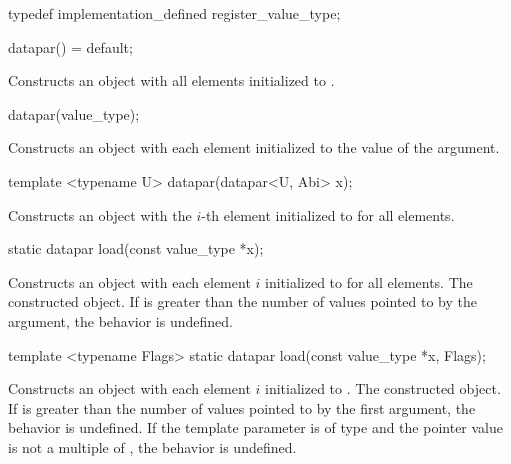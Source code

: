 \begin{wgText}
  \begin{itemdecl}
typedef implementation_defined register_value_type;
  \end{itemdecl}
  \begin{itemdescr}
  \end{itemdescr}

  \begin{itemdecl}
datapar() = default;
  \end{itemdecl}
  \begin{itemdescr}
    \pnum
    \effects
    Constructs an object with all elements initialized to .
  \end{itemdescr}

  \begin{itemdecl}
datapar(value_type);
  \end{itemdecl}
  \begin{itemdescr}
    \pnum
    \effects
    Constructs an object with each element initialized to the value of the argument.
  \end{itemdescr}

  \begin{itemdecl}
template <typename U> datapar(datapar<U, Abi> x);
  \end{itemdecl}
  \begin{itemdescr}
    \pnum
    \effects
    Constructs an object with the $i$-th element initialized to  for all elements.
  \end{itemdescr}

  \begin{itemdecl}
static datapar load(const value_type *x);
  \end{itemdecl}
  \begin{itemdescr}
    \pnum \effects Constructs an object with each element $i$ initialized to  for all elements.
    \pnum \returns The constructed object.
    \pnum \remarks If \datapar{} is greater than the number of values pointed to by the argument, the behavior is undefined.
  \end{itemdescr}

  \begin{itemdecl}
template <typename Flags> static datapar load(const value_type *x, Flags);
  \end{itemdecl}
  \begin{itemdescr}
    \pnum\effects Constructs an object with each element $i$ initialized to .
    \pnum\returns The constructed object.
    \pnum\remarks If \datapar{} is greater than the number of values pointed to by the first argument, the behavior is undefined.
    \pnum         If the template parameter is of type  and the pointer value is not a multiple of , the behavior is undefined.
  \end{itemdescr}


\end{wgText}
